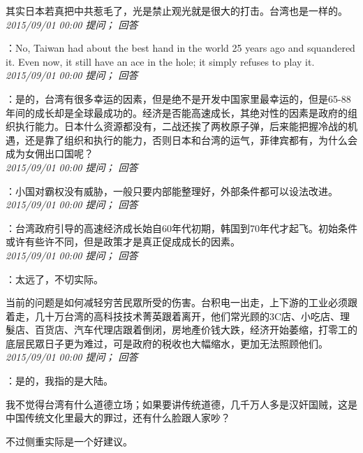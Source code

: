 \documentclass[twocolumn]{ctexart}
\begin{document}
其实日本若真把中共惹毛了，光是禁止观光就是很大的打击。台湾也是一样的。\\

\textit{\hfill\noindent\small 2015/09/01 00:00 提问； 回答}

：No, Taiwan had about the best hand in the world 25 years ago and squandered it. Even now, it still have an ace in the hole; it simply refuses to play it.\\

\textit{\hfill\noindent\small 2015/09/01 00:00 提问； 回答}

：是的，台湾有很多幸运的因素，但是绝不是开发中国家里最幸运的，但是65-88年间的成长却是全球最成功的。经济是否能高速成长，其绝对性的因素是政府的组织执行能力。日本什么资源都没有，二战还挨了两枚原子弹，后来能把握冷战的机遇，还是靠了组织和执行的能力，否则日本和台湾的运气，菲律宾都有，为什么会成为女佣出口国呢？\\

\textit{\hfill\noindent\small 2015/09/01 00:00 提问； 回答}

：小国对霸权没有威胁，一般只要内部能整理好，外部条件都可以设法改进。\\

\textit{\hfill\noindent\small 2015/09/01 00:00 提问； 回答}

：台湾政府引导的高速经济成长始自60年代初期，韩国到70年代才起飞。初始条件或许有些许不同，但是政策才是真正促成成长的因素。\\

\textit{\hfill\noindent\small 2015/09/01 00:00 提问； 回答}

：太远了，不切实际。

当前的问题是如何减轻穷苦民眾所受的伤害。台积电一出走，上下游的工业必须跟着走，几十万台湾的高科技技术菁英跟着离开，他们常光顾的3C店、小吃店、理髮店、百货店、汽车代理店跟着倒闭，房地產价钱大跌，经济开始萎缩，打零工的底层民眾日子更为难过，可是政府的税收也大幅缩水，更加无法照顾他们。\\

\textit{\hfill\noindent\small 2015/09/01 00:00 提问； 回答}

：是的，我指的是大陆。

我不觉得台湾有什么道德立场；如果要讲传统道德，几千万人多是汉奸国贼，这是中国传统文化里最大的罪过，还有什么脸跟人家吵？

不过侧重实际是一个好建议。\\
\end{document}

